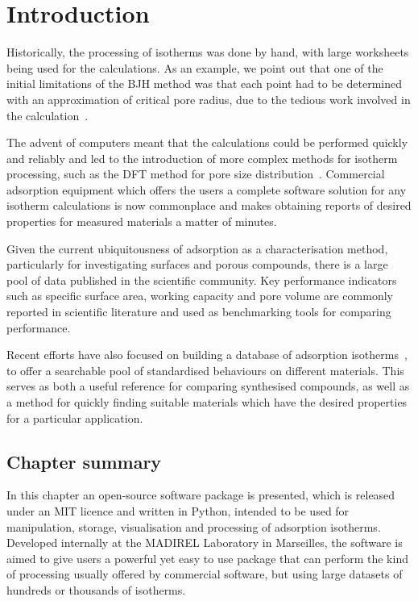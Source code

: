 
\section{Introduction}

Historically, the processing of isotherms was done by hand, with large 
worksheets being used for the calculations. As an example, 
we point out that one of the initial limitations of the BJH method was 
that each point had to 
be determined with an approximation of critical pore radius, due to the 
tedious work involved in the 
calculation~\cite{barrettDeterminationPoreVolume1951}.

The advent of computers meant that the calculations could be performed
quickly and reliably and led to the introduction of more complex
methods for isotherm processing, such as the DFT method for pore size
distribution~\cite{seatonNewAnalysisMethod1989,%
tarazonaPhaseEquilibriaFluid1987}. 
Commercial adsorption equipment which offers the users
a complete software solution for any isotherm calculations is now
commonplace and makes obtaining reports of desired properties
for measured materials a matter of minutes.

Given the current ubiquitousness of adsorption as a characterisation method,
particularly for investigating surfaces and porous compounds,
there is a large pool of data published in the scientific community.
Key performance indicators such as specific surface area, working 
capacity and pore volume are commonly reported in scientific literature
and used as benchmarking tools for comparing performance.

Recent efforts have also focused on building a database of adsorption 
isotherms~\cite{sideriusNISTARPAEDatabase2015}, to offer a searchable
pool of standardised behaviours on different materials. This serves as both a
useful reference for comparing synthesised compounds, as well as a
method for quickly finding suitable materials which have the
desired properties for a particular application.

\subsection*{Chapter summary}

In this chapter an open-source software package is presented, which 
is released under an MIT licence and written in Python, intended to be
used for manipulation, storage, visualisation and processing of
adsorption isotherms. Developed internally at the MADIREL Laboratory in
Marseilles, the software is aimed to give users a powerful yet easy to
use package that can perform the kind of processing usually offered by
commercial software, but using large datasets of hundreds or thousands
of isotherms.


